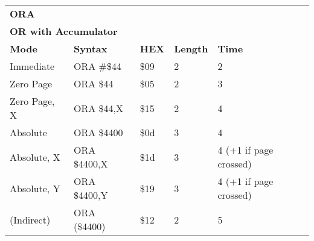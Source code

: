 \begin{table}[H]
\begin{tabular}{p{}p{}p{}p{}p{}}
\multicolumn{5}{p{0.22\textwidth}}{\huge\textbf{ORA}}\\
\multicolumn{5}{p{0.9\textwidth}}{\textbf{OR with Accumulator}}\\ \hline
\multicolumn{1}{|p{0.22\textwidth}|}{\textbf{Mode}}&\multicolumn{1}{|p{0.2\textwidth}|}{\textbf{Syntax}}&\multicolumn{1}{|p{0.1\textwidth}|}{\textbf{HEX}}&\multicolumn{1}{|p{0.1\textwidth}|}{\textbf{Length}}&\multicolumn{1}{|p{0.4\textwidth}|}{\textbf{Time}}\\ \hline
\multicolumn{1}{|p{0.22\textwidth}|}{Immediate}&\multicolumn{1}{|p{0.2\textwidth}|}{ORA \#\$44}&\multicolumn{1}{|p{0.1\textwidth}|}{\$09}&\multicolumn{1}{|p{0.1\textwidth}|}{2}&\multicolumn{1}{|p{0.4\textwidth}|}{2}\\ \hline
\multicolumn{1}{|p{0.22\textwidth}|}{Zero Page}&\multicolumn{1}{|p{0.2\textwidth}|}{ORA \$44}&\multicolumn{1}{|p{0.1\textwidth}|}{\$05}&\multicolumn{1}{|p{0.1\textwidth}|}{2}&\multicolumn{1}{|p{0.4\textwidth}|}{3}\\ \hline
\multicolumn{1}{|p{0.22\textwidth}|}{Zero Page, X}&\multicolumn{1}{|p{0.2\textwidth}|}{ORA \$44,X}&\multicolumn{1}{|p{0.1\textwidth}|}{\$15}&\multicolumn{1}{|p{0.1\textwidth}|}{2}&\multicolumn{1}{|p{0.4\textwidth}|}{4}\\ \hline
\multicolumn{1}{|p{0.22\textwidth}|}{Absolute}&\multicolumn{1}{|p{0.2\textwidth}|}{ORA \$4400}&\multicolumn{1}{|p{0.1\textwidth}|}{\$0d}&\multicolumn{1}{|p{0.1\textwidth}|}{3}&\multicolumn{1}{|p{0.4\textwidth}|}{4}\\ \hline
\multicolumn{1}{|p{0.22\textwidth}|}{Absolute, X}&\multicolumn{1}{|p{0.2\textwidth}|}{ORA \$4400,X}&\multicolumn{1}{|p{0.1\textwidth}|}{\$1d}&\multicolumn{1}{|p{0.1\textwidth}|}{3}&\multicolumn{1}{|p{0.4\textwidth}|}{4 (+1 if page crossed)}\\ \hline
\multicolumn{1}{|p{0.22\textwidth}|}{Absolute, Y}&\multicolumn{1}{|p{0.2\textwidth}|}{ORA \$4400,Y}&\multicolumn{1}{|p{0.1\textwidth}|}{\$19}&\multicolumn{1}{|p{0.1\textwidth}|}{3}&\multicolumn{1}{|p{0.4\textwidth}|}{4 (+1 if page crossed)}\\ \hline
\multicolumn{1}{|p{0.22\textwidth}|}{(Indirect)}&\multicolumn{1}{|p{0.2\textwidth}|}{ORA (\$4400)}&\multicolumn{1}{|p{0.1\textwidth}|}{\$12}&\multicolumn{1}{|p{0.1\textwidth}|}{2}&\multicolumn{1}{|p{0.4\textwidth}|}{5}\\ \hline

\end{tabular}
\end{table}
